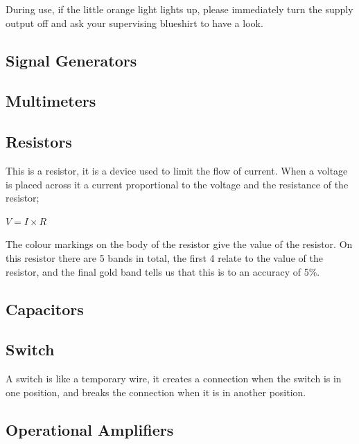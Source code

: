 During use, if the little orange light lights up, please immediately turn the supply output off and ask your supervising blueshirt to have a look.

\subsection{Signal Generators}

\subsection{Multimeters}

\subsection{Resistors}
This is a resistor, it is a device used to limit the flow of current.
When a voltage is placed across it a current proportional to the voltage and the resistance of the resistor;

$V = I \times R$

The colour markings on the body of the resistor give the value of the resistor.
On this resistor there are 5 bands in total, the first 4 relate to the value of the resistor, and the final gold band tells us that this is to an accuracy of 5\%.

%

\subsection{Capacitors}



\subsection{Switch}
A switch is like a temporary wire, it creates a connection when the switch is in one position, and breaks the connection when it is in another position.


\subsection{Operational Amplifiers}


